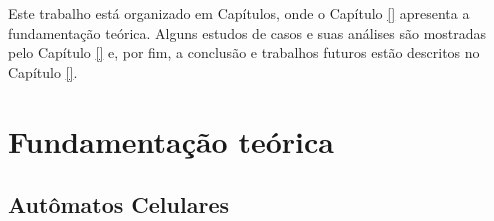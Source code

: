 Este trabalho está organizado em Capítulos, onde o Capítulo \ref{} apresenta a fundamentação teórica. Alguns estudos de casos e suas análises são mostradas pelo Capítulo \ref{} e, por fim, a conclusão e trabalhos futuros estão descritos no Capítulo \ref{}.

\chapter{Fundamentação teórica}\label{chp:LABEL_CHP_1}

\section{Autômatos Celulares}\label{sec:LABEL_CHP_1_SEC_A}
%  


